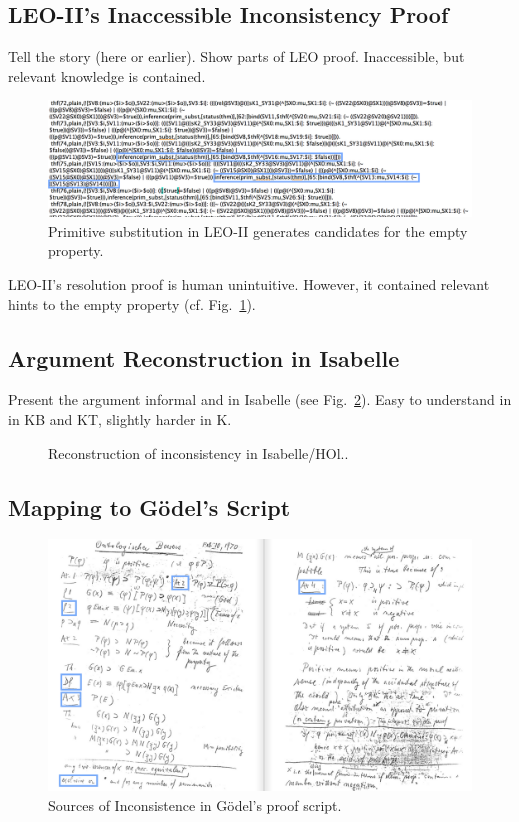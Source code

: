 \documentclass{article}
\begin{document}
\subsection{LEO-II's Inaccessible Inconsistency Proof}
Tell the story (here or earlier). Show parts of LEO proof.  Inaccessible, but relevant knowledge
is contained.
\begin{figure}
\centerline{\includegraphics[width=\textwidth]{./Images/LEO-Proof.png}}
\caption{Primitive substitution in LEO-II generates candidates for the
empty property.} \label{LEO-Proof}
\end{figure}
LEO-II's resolution proof is human unintuitive. However, it contained
relevant hints to the empty property (cf. Fig.~\ref{LEO-Proof}).

\subsection{Argument Reconstruction in Isabelle}
Present the argument informal and in Isabelle (see
Fig.~\ref{InconsistencyIsabelleK}). Easy to understand in 
in KB and KT, slightly harder in K.
\begin{figure}
\caption{Reconstruction of inconsistency in Isabelle/HOl..} \label{InconsistencyIsabelleK}
\end{figure}


\subsection{Mapping to Gödel's Script}
\begin{figure}
\centerline{\includegraphics[width=\textwidth]{./Images/Manuscript2.png}}
\caption{Sources of Inconsistence in G\"{o}del's proof script.} \label{GoedelScript}
\end{figure}
\end{document}
